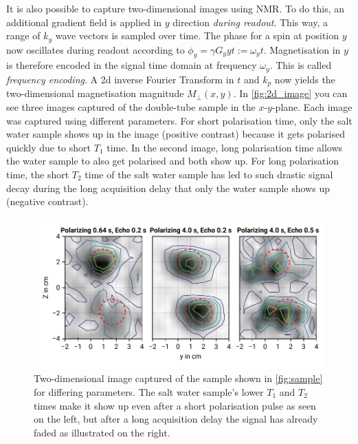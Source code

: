 \documentclass[
    parskip=half, 
    twoside=false,
    twocolumn=true,
    fontsize=11pt,
]{scrarticle}
\begin{document}
It is also possible to capture two-dimensional images using NMR. To do this, an additional gradient field is applied in $y$ direction \textit{during readout}. This way, a range of $k_y$ wave vectors is sampled over time. The phase for a spin at position $y$ now oscillates during readout according to $\phi_y = \gamma G_y y t := \omega_y t$. Magnetisation in $y$ is therefore encoded in the signal time domain at frequency $\omega_y$. This is called \textit{frequency encoding}. A 2d inverse Fourier Transform in $t$ and $k_p$ now yields the two-dimensional magnetisation magnitude $M_\bot(x,y)$. In \autoref{fig:2d_image} you can see three images captured of the double-tube sample in the $x$-$y$-plane. Each image was captured using different parameters. For short polarisation time, only the salt water sample shows up in the image (positive contrast) because it gets polarised quickly due to short $T_1$ time. In the second image, long polarisation time allows the water sample to also get polarised and both show up. For long polarisation time, the short $T_2$ time of the salt water sample has led to such drastic signal decay during the long acquisition delay that only the water sample shows up (negative contrast).

\begin{figure}
    \centering
    \includegraphics{figures/08 2d imaging.pdf}
    \caption{Two-dimensional image captured of the sample shown in \autoref{fig:sample} for differing parameters. The salt water sample's lower $T_1$ and $T_2$ times make it show up even after a short polarisation pulse as seen on the left, but after a long acquisition delay the signal has already faded as illustrated on the right.}
    \label{fig:2d_image}
\end{figure}

\pagebreak
\end{document}
